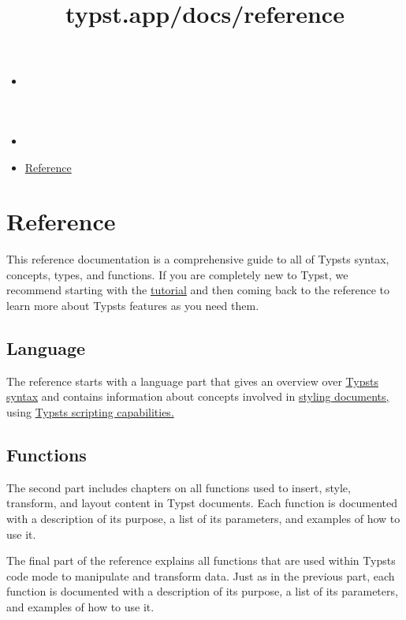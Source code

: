 \title{typst.app/docs/reference}

\begin{itemize}
\tightlist
\item
  \href{/docs}{}
\item
  
\item
  \href{/docs/reference/}{Reference}
\end{itemize}

\section{Reference}\label{reference}

This reference documentation is a comprehensive guide to all of
Typst\textquotesingle s syntax, concepts, types, and functions. If you
are completely new to Typst, we recommend starting with the
\href{/docs/tutorial/}{tutorial} and then coming back to the reference
to learn more about Typst\textquotesingle s features as you need them.

\subsection{Language}\label{language}

The reference starts with a language part that gives an overview over
\href{/docs/reference/syntax/}{Typst\textquotesingle s syntax} and
contains information about concepts involved in
\href{/docs/reference/styling/}{styling documents,} using
\href{/docs/reference/scripting/}{Typst\textquotesingle s scripting
capabilities.}

\subsection{Functions}\label{functions}

The second part includes chapters on all functions used to insert,
style, transform, and layout content in Typst documents. Each function
is documented with a description of its purpose, a list of its
parameters, and examples of how to use it.

The final part of the reference explains all functions that are used
within Typst\textquotesingle s code mode to manipulate and transform
data. Just as in the previous part, each function is documented with a
description of its purpose, a list of its parameters, and examples of
how to use it.

